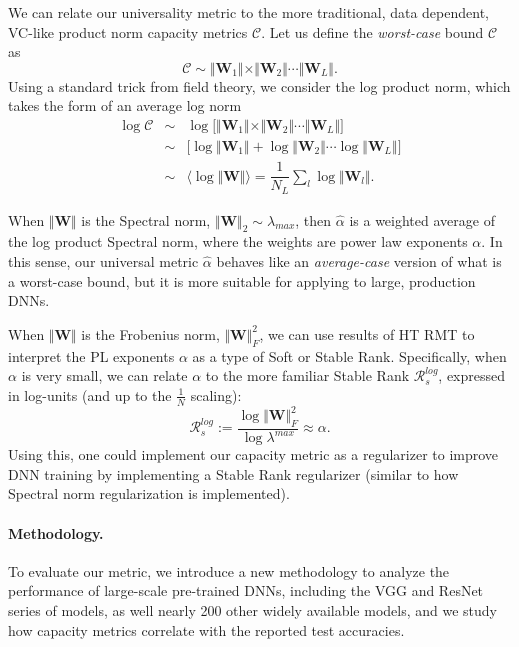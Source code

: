 We can relate our universality metric to the more traditional, data dependent, VC-like product norm capacity metrics $\mathcal{C}$.
Let us define the \emph{worst-case} bound $\mathcal{C}$ as
\begin{equation}
\mathcal{C}\sim\Vert\mathbf{W}_{1}\Vert\times\Vert\mathbf{W}_{2}\Vert\cdots\Vert\mathbf{W}_{L}\Vert   .
\end{equation}
Using a standard trick from field theory, we consider the log product norm, which takes the form of an average log norm
\begin{eqnarray*}
\log\mathcal{C} &\sim& \log\bigg[\Vert\mathbf{W}_{1}\Vert\times\Vert\mathbf{W}_{2}\Vert\cdots\Vert\mathbf{W}_{L}\Vert\bigg]  \\
                &\sim& \bigg[\log\Vert\mathbf{W}_{1}\Vert+\log\Vert\mathbf{W}_{2}\Vert\cdots\log\Vert\mathbf{W}_{L}\Vert\bigg]  \\
                &\sim&  \langle\log\Vert\mathbf{W}\Vert\rangle=\dfrac{1}{N_{L}}\sum_{l}\log\Vert\mathbf{W}_{l}\Vert   .
\end{eqnarray*}

When $\Vert\mathbf{W}\Vert$ is the Spectral norm, $\Vert\mathbf{W}\Vert_{2}\sim\lambda_{max}$, then $\hat{\alpha}$ is a weighted average of the log product Spectral norm, where the weights are power law exponents $\alpha$. 
In this sense, our universal metric $\hat{\alpha}$ behaves like an \emph{average-case} version of what is a worst-case bound, but it is more suitable for applying to large, production DNNs.
 
When $\Vert\mathbf{W}\Vert$ is the Frobenius norm, $\Vert\mathbf{W}\Vert^{2}_{F}$, we can use results of HT RMT to interpret the PL exponents $\alpha$ as a type of Soft or Stable Rank. 
Specifically, when $\alpha$ is very small, we can relate $\alpha$ to the more familiar Stable Rank $\mathcal{R}^{log}_{s}$, expressed in log-units (and up to the $\frac{1}{N}$ scaling):
\begin{equation}
\mathcal{R}^{log}_{s}:=\dfrac{\log\Vert\mathbf{W}\Vert^{2}_{F}}{\log\lambda^{max}}  \approx \alpha  .
\end{equation}
Using this, one could implement our capacity metric as a regularizer to improve DNN training by
implementing a Stable Rank regularizer (similar to how Spectral norm regularization is implemented).


\paragraph{Methodology.} 
To evaluate our metric, we introduce a new methodology to analyze the performance of large-scale pre-trained DNNs, including the VGG and ResNet series of models, as well nearly 200 other widely available models, and we study how capacity metrics correlate with the reported test accuracies.
 
